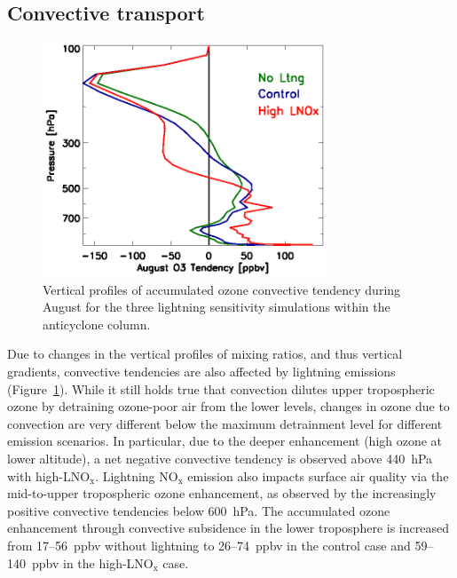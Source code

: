\subsection{Convective transport}

 \begin{figure}
 \noindent\includegraphics[width=20pc]{figures/ltngsens_o3conv.eps}
 \caption{Vertical profiles of accumulated ozone convective tendency
during August for the three lightning sensitivity simulations within the
anticyclone column.}
 \label{fig:ltng_conv}
 \end{figure}

Due to changes in the vertical profiles of mixing ratios, and thus
vertical gradients, convective tendencies are also affected by lightning
emissions (Figure~\ref{fig:ltng_conv}). While it still holds true that convection
dilutes upper tropospheric ozone by detraining ozone-poor air from the
lower levels, changes in ozone due to convection are very different below
the maximum detrainment level for different emission scenarios. In
particular, due to the deeper enhancement (high ozone at lower altitude),
a net negative convective tendency is observed above 440~hPa with
high-LNO$_\mathrm{x}$. Lightning $\mathrm{NO_x}$ emission also impacts surface air quality
via the mid-to-upper tropospheric ozone enhancement, as observed by
the increasingly positive convective tendencies below 600~hPa. The accumulated
ozone enhancement through convective subsidence in the lower troposphere
is increased from 17--56~ppbv without lightning to 26--74~ppbv in the
control case and 59--140~ppbv in the high-LNO$_{\mathrm{x}}$ case.

